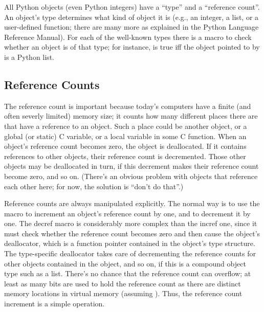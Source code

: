 All Python objects (even Python integers) have a ``type'' and a 
``reference count''.  An object's type determines what kind of object 
it is (e.g., an integer, a list, or a user-defined function; there are 
many more as explained in the Python Language Reference Manual).  For 
each of the well-known types there is a macro to check whether an 
object is of that type; for instance,  is true 
iff the object pointed to by  is a Python list.

\subsection{Reference Counts}

The reference count is important because today's computers have a 
finite (and often severly limited) memory size; it counts how many 
different places there are that have a reference to an object.  Such a 
place could be another object, or a global (or static) C variable, or 
a local variable in some C function.  When an object's reference count 
becomes zero, the object is deallocated.  If it contains references to 
other objects, their reference count is decremented.  Those other 
objects may be deallocated in turn, if this decrement makes their 
reference count become zero, and so on.  (There's an obvious problem 
with objects that reference each other here; for now, the solution is 
``don't do that''.)

Reference counts are always manipulated explicitly.  The normal way is 
to use the macro  to increment an object's 
reference count by one, and  to decrement it by 
one.  The decref macro is considerably more complex than the incref one, 
since it must check whether the reference count becomes zero and then 
cause the object's deallocator, which is a function pointer contained 
in the object's type structure.  The type-specific deallocator takes 
care of decrementing the reference counts for other objects contained 
in the object, and so on, if this is a compound object type such as a 
list.  There's no chance that the reference count can overflow; at 
least as many bits are used to hold the reference count as there are 
distinct memory locations in virtual memory (assuming 
).  Thus, the reference count 
increment is a simple operation.

